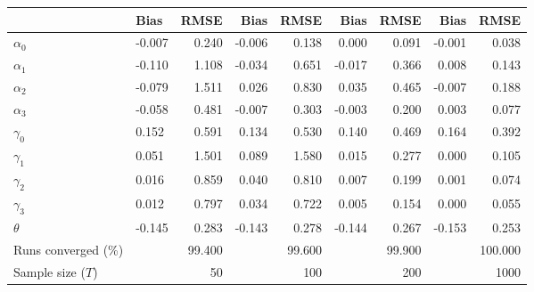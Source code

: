 
\begin{tabular}[t]{llrrrrrrr}
\toprule
  & Bias & RMSE & Bias & RMSE & Bias & RMSE & Bias & RMSE\\
\midrule
$\alpha_{0}$ & -0.007 & 0.240 & -0.006 & 0.138 & 0.000 & 0.091 & -0.001 & 0.038\\
$\alpha_{1}$ & -0.110 & 1.108 & -0.034 & 0.651 & -0.017 & 0.366 & 0.008 & 0.143\\
$\alpha_{2}$ & -0.079 & 1.511 & 0.026 & 0.830 & 0.035 & 0.465 & -0.007 & 0.188\\
$\alpha_{3}$ & -0.058 & 0.481 & -0.007 & 0.303 & -0.003 & 0.200 & 0.003 & 0.077\\
$\gamma_{0}$ & 0.152 & 0.591 & 0.134 & 0.530 & 0.140 & 0.469 & 0.164 & 0.392\\
$\gamma_{1}$ & 0.051 & 1.501 & 0.089 & 1.580 & 0.015 & 0.277 & 0.000 & 0.105\\
$\gamma_{2}$ & 0.016 & 0.859 & 0.040 & 0.810 & 0.007 & 0.199 & 0.001 & 0.074\\
$\gamma_{3}$ & 0.012 & 0.797 & 0.034 & 0.722 & 0.005 & 0.154 & 0.000 & 0.055\\
$\theta$ & -0.145 & 0.283 & -0.143 & 0.278 & -0.144 & 0.267 & -0.153 & 0.253\\
Runs converged (\%) &  & 99.400 &  & 99.600 &  & 99.900 &  & 100.000\\
Sample size ($T$) &  & 50 &  & 100 &  & 200 &  & 1000\\
\bottomrule
\end{tabular}
